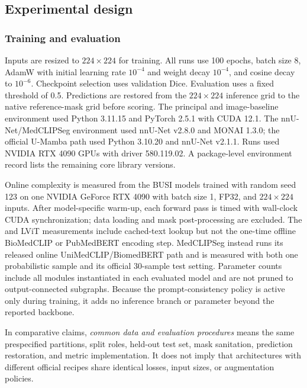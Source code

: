 \subsection{Experimental design}
\label{sec:experiments}
\subsubsection{Training and evaluation}
Inputs are resized to $224\times224$ for training. All \methodname{} runs use 100 epochs,
batch size 8, AdamW with initial learning rate $10^{-4}$ and weight decay
$10^{-4}$, and cosine decay to $10^{-6}$. Checkpoint selection uses validation
Dice. Evaluation uses a fixed threshold of 0.5. Predictions are restored from
the $224\times224$ inference grid to the native reference-mask grid before
scoring.
The principal \methodname{} and image-baseline environment used Python 3.11.15 and
PyTorch 2.5.1 with CUDA 12.1. The nnU-Net/MedCLIPSeg environment used
nnU-Net v2.8.0 and MONAI 1.3.0; the official U-Mamba path used Python 3.10.20
and nnU-Net v2.1.1. Runs used NVIDIA RTX 4090 GPUs with driver 580.119.02.
A package-level environment record lists the remaining core library versions.

Online complexity is measured from the BUSI models trained with random seed 123 on one
NVIDIA GeForce RTX 4090 with batch size 1, FP32, and $224\times224$ inputs.
After model-specific warm-up, each forward pass is timed with wall-clock CUDA
synchronization; data loading and mask post-processing are excluded. The \methodname{}
and LViT measurements include cached-text lookup but not the one-time offline
BioMedCLIP or PubMedBERT encoding step. MedCLIPSeg instead runs its released
online UniMedCLIP/BiomedBERT path and is measured with both one probabilistic
sample and its official 30-sample test setting. Parameter counts include all
modules instantiated in each evaluated model and are not pruned to
output-connected subgraphs. Because the prompt-consistency policy is active only
during training, it adds no inference branch or parameter beyond the reported
\methodname{} backbone.

In comparative claims, \textit{common data and evaluation procedures} means the
same prespecified partitions, split roles, held-out test set, mask sanitation,
prediction restoration, and metric implementation. It does not imply that
architectures with different official recipes share identical losses, input
sizes, or augmentation policies.

